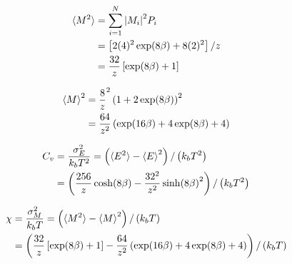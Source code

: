 \begin{appendices}
\begin{align}
  \braket{M^2} &= \sum_{i=1}^{N} \abs{M_i}^2 P_i \\
               &= \left[2 (4)^2 \exp(8\beta) + 8 (2)^2\right] / z \\
               &= \frac{32}{z} \left[ \exp(8\beta) + 1 \right]
\end{align}

\begin{align}
  \braket{M}^2 &= \frac{8}{z}^2 \left( 1 + 2\exp(8\beta) \right)^2 \\
               &= \frac{64}{z^2} \left( \exp(16\beta) + 4\exp(8\beta) +  4\right)
\end{align}

\begin{align}
  C_v &= \frac{\sigma_E^2}{k_b T^2} = \left(\braket{E^2} - \braket{E}^2\right) / \left(k_b T^2\right)\\
    &= \left(\frac{256}{z} \cosh(8\beta) - \frac{32^2}{z^2} \sinh(8\beta)^2\right) /\left(k_b T^2\right)
\end{align}

\begin{align}
  \chi &= \frac{\sigma_M^2}{k_b T} = \left(\braket{M^2} - \braket{M}^2\right) / \left(k_b T\right)\\
       &= \left(\frac{32}{z} \left[ \exp(8\beta) + 1 \right] - \frac{64}{z^2} \left( \exp(16\beta) + 4\exp(8\beta) +  4\right) \right)/\left(k_b T\right)
\end{align}

%
%
%


\end{appendices}
